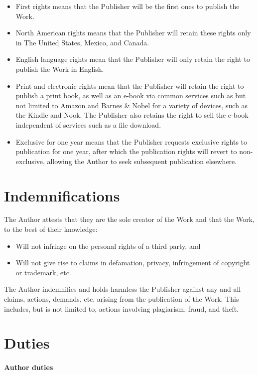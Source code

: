 \documentclass[12pt,letterpaper]{article}
\begin{document}
\begin{itemize}
    \item First rights means that the Publisher will be the first ones to publish the Work.
    \item North American rights means that the Publisher will retain these rights only in The United States, Mexico, and Canada.
    \item English language rights mean that the Publisher will only retain the right to publish the Work in English.
    \item Print and electronic rights mean that the Publisher will retain the right to publish a print book, as well as an e-book via common services such as but not limited to Amazon and Barnes \& Nobel for a variety of devices, such as the Kindle and Nook. The Publisher also retains the right to sell the e-book independent of services such as a file download.
    \item Exclusive for one year means that the Publisher requests exclusive rights to publication for one year, after which the publication rights will revert to non-exclusive, allowing the Author to seek subsequent publication elsewhere.
\end{itemize}

\section{Indemnifications}

The Author attests that they are the sole creator of the Work and that the Work, to the best of their knowledge:

\begin{itemize}
    \item Will not infringe on the personal rights of a third party, and
    \item Will not give rise to claims in defamation, privacy, infringement of copyright or trademark, etc.
\end{itemize}

The Author indemnifies and holds harmless the Publisher against any and all claims, actions, demands, etc. arising from the publication of the Work. This includes, but is not limited to, actions involving plagiarism, fraud, and theft.

\section{Duties}

\paragraph{Author duties}
\end{document}
